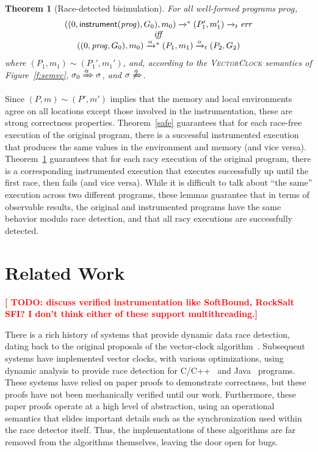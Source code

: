 \documentclass[preprint, 10pt]{sigplanconf}
\newcommand{\TODO}[1]{\textbf{\textcolor{red}{[ TODO: #1]}}}
\newcommand{\VCalg}{\textsc{VectorClock}\xspace}
\newcommand{\instrp}[1]{\ensuremath{\mathsf{instrument}(#1)}}
\newcommand{\cfg}[2]{\ensuremath{(#1, #2)}}
\newcommand{\execstar}[4]{\ensuremath{\cfg{#1}{#2} \tto{#3} #4}}
\newcommand{\execs}[3]{\ensuremath{ \xrightarrow{#2}_{#1} #3}}
\newcommand{\tto}[1]{\mathrel{
  \vphantom{\xrightarrow{#1}}
  \smash{\xrightarrow{#1}}
  \vphantom{\to}^{*}}
}
\newtheorem{theorem}{Theorem}
\begin{document}
\begin{theorem}[Race-detected bisimulation]\label{race}For all well-formed programs $\mathit{prog}$, 
\[
\begin{array}{c}
\execstar{(0, \instrp{\mathit{prog}}, G_0)}{m_0}{}{(P_1', m_1')} \execs{t}{}{\mathit{err}}\\ 
\mathit{iff} \\ 
\execstar{(0, \mathit{prog}, G_0)}{m_0}{\alpha}{(P_1, m_1)} \execs{t}{o}{(P_2, G_2)}
\end{array}
\]
%
where $(P_1, m_1) \sim (P_1', m_1')$, and, according to the \VCalg semantics of Figure~\ref{f:semvc}, $\sigma_0 \xRightarrow{\alpha} \sigma$, and $\sigma \not\xRightarrow{o}$.

\end{theorem}
Since $(P, m) \sim (P', m')$ implies that the memory and local environments agree on all locations except those involved in the instrumentation, these are strong correctness properties. Theorem~\ref{safe} guarantees that for each race-free execution of the original program, there is a successful instrumented execution that produces the same values in the environment and memory (and vice versa). Theorem~\ref{race} guarantees that for each racy execution of the original program, there is a corresponding instrumented execution that executes successfully up until the first race, then fails (and vice versa). While it is difficult to talk about ``the same'' execution across two different programs, these lemmas guarantee that in terms of observable results, the original and instrumented programs have the same behavior modulo race detection, and that all racy executions are successfully detected.

\section{Related Work}
\label{related}

\TODO{discuss verified instrumentation like SoftBound, RockSalt SFI? I don't think either of these support multithreading.}

There is a rich history of systems that provide dynamic data race detection, dating back to the original proposals of the vector-clock algorithm~\cite{vcfidge,vcmattern,lamporthb}. Subsequent systems have implemented vector clocks, with various optimizations, using dynamic analysis to provide race detection for C/C++~\cite{pozniansky_efficient_2003,serebryany_threadsanitizer:_2009} and Java~\cite{christiaens_trade:_2001,elmas_goldilocks:_2007,fasttrack,flanagan_fasttrack:_2010,slimstate} programs. These systems have relied on paper proofs to demonstrate correctness, but these proofs have not been mechanically verified until our work. Furthermore, these paper proofs operate at a high level of abstraction, using an operational semantics that elides important details such as the synchronization used within the race detector itself. Thus, the implementations of these algorithms are far removed from the algorithms themselves, leaving the door open for bugs.
\end{document}

